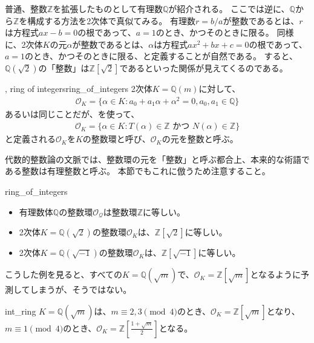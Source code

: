 普通、整数$\mathbb{Z}$を拡張したものとして有理数$\mathbb{Q}$が紹介される。
ここでは逆に、$\mathbb{Q}$から$\mathbb{Z}$を構成する方法を2次体で真似てみる。
有理数$r=b/a$が整数であるとは、$r$は方程式$ax-b=0$の根であって、$a=1$のとき、かつそのときに限る。
同様に、2次体$K$の元$\alpha$が整数であるとは、$\alpha$は方程式$ax^2+bx+c=0$の根であって、$a=1$のとき、かつそのときに限る、と定義することが自然である。
すると、$\mathbb{Q}(\sqrt{2})$の「整数」は$\mathbb{Z}[\sqrt{2}]$であるといった関係が見えてくるのである。

\begin{Defi}{, ring of integers}{ring_of_integers}
2次体$K=\mathbb{Q}(m)$に対して、
\begin{align*}
\mathcal{O}_K = \{\alpha \in K : a_0 + a_1\alpha + \alpha^2 = 0, a_0,a_1 \in \mathbb{Q}\}
\end{align*}
あるいは同じことだが、を使って、
\begin{align*}
\mathcal{O}_K = \{\alpha \in K : T(\alpha) \in \mathbb{Z} \mbox{ かつ } N(\alpha) \in \mathbb{Z}\}
\end{align*}
と定義される$\mathcal{O}_K$を$K$の整数環と呼び、$\mathcal{O}_K$の元を整数と呼ぶ。
\end{Defi}

代数的整数論の文脈では、整数環の元を「整数」と呼ぶ都合上、本来的な術語である整数は有理整数と呼ぶ。
本節でもこれに倣うため注意すること。

\begin{Exam}{}{ring_of_integers}\;
\begin{itemize}
 \item 有理数体$\mathbb{Q}$の整数環$\mathcal{O}_{\mathcal{Q}}$は整数環$\mathbb{Z}$に等しい。
 \item 2次体$K=\mathbb{Q}(\sqrt{2})$の整数環$\mathcal{O}_K$は、$\mathbb{Z}[\sqrt{2}]$に等しい。
 \item 2次体$K=\mathbb{Q}(\sqrt{-1})$の整数環$\mathcal{O}_K$は、$\mathbb{Z}[\sqrt{-1}]$に等しい。
\end{itemize}
\end{Exam}

こうした例を見ると、すべての$K=\mathbb{Q}(\sqrt{m})$で、$\mathcal{O}_K=\mathbb{Z}[\sqrt{m}]$となるように予測してしまうが、そうではない。

\begin{Prop}{}{int_ring}
$K=\mathbb{Q}(\sqrt{m})$は、$m\equiv2,3\pmod{4}$のとき、$\mathcal{O}_K=\mathbb{Z}[\sqrt{m}]$となり、$m\equiv1\pmod{4}$のとき、$\mathcal{O}_K=\mathbb{Z}[\frac{1+\sqrt{m}}{2}]$となる。
\end{Prop}

